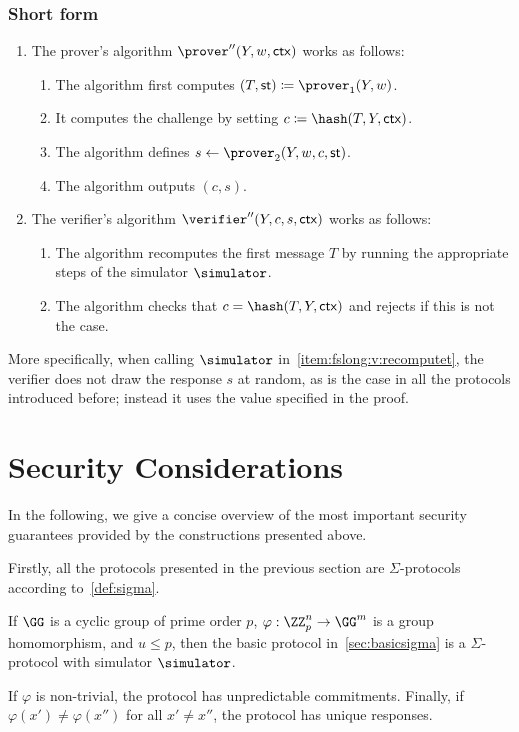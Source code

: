\documentclass[runningheads]{llncs}
\begin{document}
\subsubsection{Short form}
\begin{enumerate}
  \item
    The prover's algorithm $\prover''(Y,w,\ctx)$ works as follows:
    \begin{enumerate}
      \item
        The algorithm first computes $(T,\st)\defeq\prover_1(Y,w)$.
      \item
        It computes the challenge by setting $c\defeq\hash(T,Y,\ctx)$.
      \item
        The algorithm defines $s\gets\prover_2(Y,w,c,\st)$.
      \item
        The algorithm outputs $(c,s)$.
    \end{enumerate}
  \item
    The verifier's algorithm $\verifier''(Y,c,s,\ctx)$ works as follows:
    \begin{enumerate}
      \item\label{item:fslong:v:recomputet}
        The algorithm recomputes the first message $T$ by running the appropriate steps of the simulator $\simulator$.
      \item
        The algorithm checks that $c=\hash(T,Y,\ctx)$ and rejects if this is not the case.
    \end{enumerate}
\end{enumerate}

More specifically, when calling $\simulator$ in~\cref{item:fslong:v:recomputet}, the verifier does not draw the response $s$ at random, as is the case in all the protocols introduced before;
instead it uses the value specified in the proof.

\section{Security Considerations}

In the following, we give a concise overview of the most important security guarantees provided by the constructions presented above.

Firstly, all the protocols presented in the previous section are $\Sigma$-protocols according to~\cref{def:sigma}.
\begin{theorem}
  If $\GG$ is a cyclic group of prime order $p$, $\varphi:\ZZ_p^n\to\GG^m$ is a group homomorphism, and $u\leq p$, then the basic protocol in~\cref{sec:basicsigma} is a $\Sigma$-protocol with simulator $\simulator$.

  If $\varphi$ is non-trivial, the protocol has unpredictable commitments.
  Finally, if $\varphi(x')\ne\varphi(x'')$ for all $x'\ne x''$, the protocol has unique responses.
\end{theorem}
\end{document}
